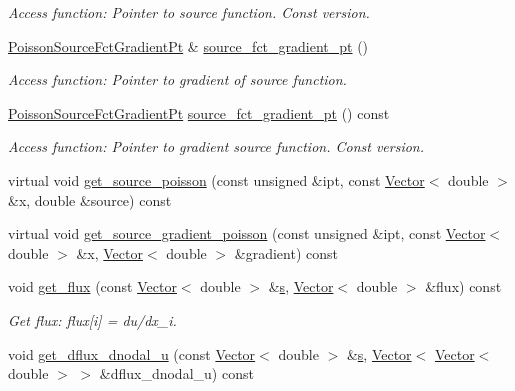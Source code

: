 \begin{DoxyCompactItemize}
\begin{DoxyCompactList}\small\item\em Access function\+: Pointer to source function. Const version. \end{DoxyCompactList}\item 
\hyperlink{classoomph_1_1PoissonEquations_a6182c46eb07d6219d6f939f0962724c4}{Poisson\+Source\+Fct\+Gradient\+Pt} \& \hyperlink{classoomph_1_1PoissonEquations_a6beea1917ccf0bd6fd794e2aaee36a9b}{source\+\_\+fct\+\_\+gradient\+\_\+pt} ()
\begin{DoxyCompactList}\small\item\em Access function\+: Pointer to gradient of source function. \end{DoxyCompactList}\item 
\hyperlink{classoomph_1_1PoissonEquations_a6182c46eb07d6219d6f939f0962724c4}{Poisson\+Source\+Fct\+Gradient\+Pt} \hyperlink{classoomph_1_1PoissonEquations_a0c3464f9f803d3a0366d0b254b8cddc4}{source\+\_\+fct\+\_\+gradient\+\_\+pt} () const
\begin{DoxyCompactList}\small\item\em Access function\+: Pointer to gradient source function. Const version. \end{DoxyCompactList}\item 
virtual void \hyperlink{classoomph_1_1PoissonEquations_a06dbfe005c721c1562f13a48fb7dfb29}{get\+\_\+source\+\_\+poisson} (const unsigned \&ipt, const \hyperlink{classoomph_1_1Vector}{Vector}$<$ double $>$ \&x, double \&source) const
\item 
virtual void \hyperlink{classoomph_1_1PoissonEquations_a05d8a527a6fe79e7506c5756d9fddd77}{get\+\_\+source\+\_\+gradient\+\_\+poisson} (const unsigned \&ipt, const \hyperlink{classoomph_1_1Vector}{Vector}$<$ double $>$ \&x, \hyperlink{classoomph_1_1Vector}{Vector}$<$ double $>$ \&gradient) const
\item 
void \hyperlink{classoomph_1_1PoissonEquations_aa11374daca090943d5abc70fa73cc763}{get\+\_\+flux} (const \hyperlink{classoomph_1_1Vector}{Vector}$<$ double $>$ \&\hyperlink{cfortran_8h_ab7123126e4885ef647dd9c6e3807a21c}{s}, \hyperlink{classoomph_1_1Vector}{Vector}$<$ double $>$ \&flux) const
\begin{DoxyCompactList}\small\item\em Get flux\+: flux\mbox{[}i\mbox{]} = du/dx\+\_\+i. \end{DoxyCompactList}\item 
void \hyperlink{classoomph_1_1PoissonEquations_a09faa6578f076ca5fb4b20aef5e2b4c6}{get\+\_\+dflux\+\_\+dnodal\+\_\+u} (const \hyperlink{classoomph_1_1Vector}{Vector}$<$ double $>$ \&\hyperlink{cfortran_8h_ab7123126e4885ef647dd9c6e3807a21c}{s}, \hyperlink{classoomph_1_1Vector}{Vector}$<$ \hyperlink{classoomph_1_1Vector}{Vector}$<$ double $>$ $>$ \&dflux\+\_\+dnodal\+\_\+u) const

\end{DoxyCompactItemize}
